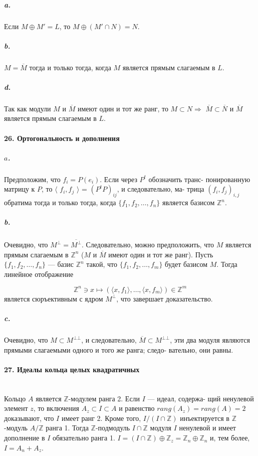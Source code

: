 \documentclass{mai_book}
\begin{document}
{\subparagraph{a.} Если $M \oplus M' = L$, то $M \oplus (M' \cap N) = N$.

\subparagraph{b.} $M = \overline{M}$ тогда и только тогда, когда $M$ является прямым слагаемым в $L$.




\subparagraph{d.} Так как модули $M$ и $\overline{M}$ имеют один и тот же ранг, то $M \subset N \Rightarrow$
$\overline{M} \subset \overline{N}$ и $\overline{M}$ является прямым слагаемым в $L$.

\paragraph{26. Ортогональность и дополнения}

\subparagraph{$a$.} Предположим, что $f_{i} = P(e_{i})$. Если через $P^t$ обозначить транс-
понированную матрицу к $P$, то $\langle$ $f_{i},f_{j}$ $\rangle$ = $(P^{t}P)_{ij}$, и следовательно, ма-
трица $(f_{i},f_{j})_{i,j}$ обратима тогда и только тогда, когда $\{f_{1},f_{2},\ldots,f_{n}\}$
является базисом $\mathbb {Z}^{n}$.

\subparagraph{b.} Очевидно, что $M^{\bot} = \overline{M^{\bot}}$. Следовательно, можно предположить,
что $M$ является прямым слагаемым в $\mathbb {Z}^{n}$ ($M$ и $\overline{M}$ имеют один и тот
же ранг). Пусть $\{f_{1},f_{2},\ldots,f_{n}\}$ --- базис $\mathbb {Z}^{n}$ такой, что $\{f_{1},f_{2},\ldots,f_{m}\}$
будет базисом $M$. Тогда линейное отображение

\begin{equation*}
\mathbb {Z}^{n} \ni x \mapsto (\langle x,f_{1} \rangle,\ldots,\langle x,f_{m} \rangle) \in \mathbb {Z}^{m}
\end{equation*}
является сюръективным с ядром $M^{\bot}$, что завершает доказательство.
\subparagraph{c.} Очевидно, что $M \subset M^{\bot\bot}$, и следовательно, $\overline{M} \subset M^{\bot\bot}$, эти два
модуля являются прямыми слагаемыми одного и того же ранга; следо-
вательно, они равны.

\paragraph{27. Идеалы кольца целых квадратичных} \mbox{}\\

Кольцо $A$ является $\mathbb {Z}$-модулем ранга 2. Если $I$ --- идеал, содержа-
щий ненулевой элемент $z$, то включения $A_{z} \subset I \subset A$ и равенство
$rang (A_{z}) = rang (A) = 2$ доказывают, что $I$ имеет ранг 2. Кроме того,
$I/(I\cap\mathbb {Z})$ инъектируется в $\mathbb {Z}$-модуль $A/\mathbb {Z}$ ранга 1. Тогда $\mathbb {Z}$-подмодуль
$I\cap\mathbb {Z}$ модуля $I$ ненулевой и имеет дополнение в $I$ обязательно ранга 1.
$I = (I\cap\mathbb {Z}) \oplus \mathbb {Z}_{z} = \mathbb {Z}_{n} \oplus \mathbb {Z}_{n}$ и, тем более, $I = A_{n} + A_{z}$.

}
\end{document}
